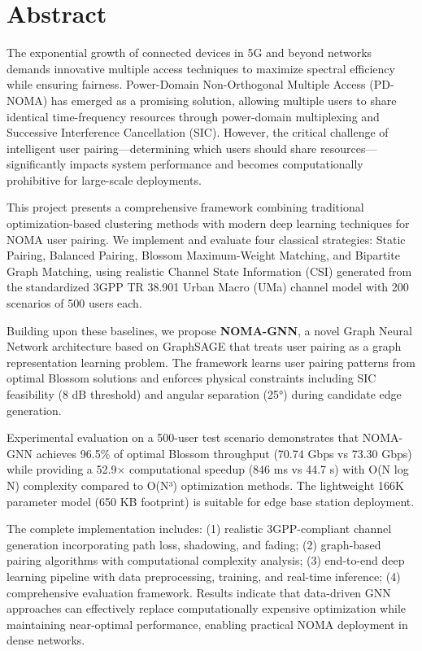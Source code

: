 \chapter*{Abstract}

\vspace{0.5cm}

The exponential growth of connected devices in 5G and beyond networks demands innovative multiple access techniques to maximize spectral efficiency while ensuring fairness. Power-Domain Non-Orthogonal Multiple Access (PD-NOMA) has emerged as a promising solution, allowing multiple users to share identical time-frequency resources through power-domain multiplexing and Successive Interference Cancellation (SIC). However, the critical challenge of intelligent user pairing—determining which users should share resources—significantly impacts system performance and becomes computationally prohibitive for large-scale deployments.

This project presents a comprehensive framework combining traditional optimization-based clustering methods with modern deep learning techniques for NOMA user pairing. We implement and evaluate four classical strategies: Static Pairing, Balanced Pairing, Blossom Maximum-Weight Matching, and Bipartite Graph Matching, using realistic Channel State Information (CSI) generated from the standardized 3GPP TR 38.901 Urban Macro (UMa) channel model with 200 scenarios of 500 users each.

Building upon these baselines, we propose \textbf{NOMA-GNN}, a novel Graph Neural Network architecture based on GraphSAGE that treats user pairing as a graph representation learning problem. The framework learns user pairing patterns from optimal Blossom solutions and enforces physical constraints including SIC feasibility (8 dB threshold) and angular separation (25°) during candidate edge generation.

Experimental evaluation on a 500-user test scenario demonstrates that NOMA-GNN achieves 96.5\% of optimal Blossom throughput (70.74 Gbps vs 73.30 Gbps) while providing a 52.9× computational speedup (846 ms vs 44.7 s) with O(N log N) complexity compared to O(N³) optimization methods. The lightweight 166K parameter model (650 KB footprint) is suitable for edge base station deployment.

The complete implementation includes: (1) realistic 3GPP-compliant channel generation incorporating path loss, shadowing, and fading; (2) graph-based pairing algorithms with computational complexity analysis; (3) end-to-end deep learning pipeline with data preprocessing, training, and real-time inference; (4) comprehensive evaluation framework. Results indicate that data-driven GNN approaches can effectively replace computationally expensive optimization while maintaining near-optimal performance, enabling practical NOMA deployment in dense networks.

